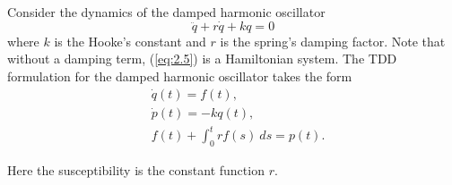 \begin{example}
Consider the dynamics of the damped harmonic oscillator
\begin{equation} \label{eq:2.5}
	\ddot q + r \dot q + k q = 0
\end{equation}
where $k$ is the Hooke's constant and $r$ is the spring's damping factor. Note that without a damping term, (\ref{eq:2.5}) is a Hamiltonian system. The TDD formulation for the damped harmonic oscillator takes the form
\begin{equation}
	\begin{aligned}
		& \dot q(t) = f(t), \\
		& \dot p(t) = - k q(t), \\
		& f(t) + \int_0^t r f(s) \ ds = p(t).
	\end{aligned}
\end{equation}
\end{example}
Here the susceptibility is the constant function $r$.
